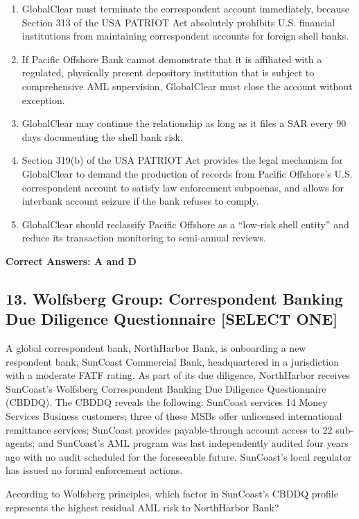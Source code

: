 \documentclass[11pt,a4paper]{article}
\begin{document}
	\begin{enumerate}[label=\Alph*.]
		\item GlobalClear must terminate the correspondent account immediately, because Section 313 of the USA PATRIOT Act absolutely prohibits U.S. financial institutions from maintaining correspondent accounts for foreign shell banks.
		\item If Pacific Offshore Bank cannot demonstrate that it is affiliated with a regulated, physically present depository institution that is subject to comprehensive AML supervision, GlobalClear must close the account without exception.
		\item GlobalClear may continue the relationship as long as it files a SAR every 90 days documenting the shell bank risk.
		\item Section 319(b) of the USA PATRIOT Act provides the legal mechanism for GlobalClear to demand the production of records from Pacific Offshore's U.S. correspondent account to satisfy law enforcement subpoenas, and allows for interbank account seizure if the bank refuses to comply.
		\item GlobalClear should reclassify Pacific Offshore as a ``low-risk shell entity'' and reduce its transaction monitoring to semi-annual reviews.
	\end{enumerate}
	\textbf{Correct Answers: A and D}
	
	\subsection{13. Wolfsberg Group: Correspondent Banking Due Diligence Questionnaire \textnormal{[SELECT ONE]}}
	
	A global correspondent bank, NorthHarbor Bank, is onboarding a new respondent bank, SunCoast Commercial Bank, headquartered in a jurisdiction with a moderate FATF rating. As part of its due diligence, NorthHarbor receives SunCoast's Wolfsberg Correspondent Banking Due Diligence Questionnaire (CBDDQ). The CBDDQ reveals the following: SunCoast services 14 Money Services Business customers; three of these MSBs offer unlicensed international remittance services; SunCoast provides payable-through account access to 22 sub-agents; and SunCoast's AML program was last independently audited four years ago with no audit scheduled for the foreseeable future. SunCoast's local regulator has issued no formal enforcement actions.
	
	According to Wolfsberg principles, which factor in SunCoast's CBDDQ profile represents the highest residual AML risk to NorthHarbor Bank?
	
\end{document}

